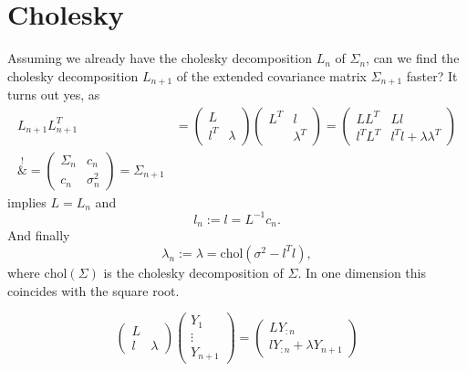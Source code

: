 \section{Cholesky}

Assuming we already have the cholesky decomposition \(L_n\) of \(\Sigma_n\),
can we find the cholesky decomposition \(L_{n+1}\) of the extended covariance
matrix \(\Sigma_{n+1}\) faster? It turns out yes, as
\[
	\begin{aligned}
	L_{n+1}L_{n+1}^T
	&=\begin{pmatrix}
		L & \\
		l^T &\lambda
	\end{pmatrix}
	\begin{pmatrix}
		L^T &  l\\
		&\lambda^T
	\end{pmatrix}
	= \begin{pmatrix}
		L L^T & L l\\
		l^T L^T & l^T l + \lambda\lambda^T
	\end{pmatrix}\\
	\overset!&= \begin{pmatrix}
		\Sigma_n & c_n \\
		c_n & \sigma_n^2
	\end{pmatrix} = \Sigma_{n+1}
	\end{aligned}
\]
implies \(L = L_n\) and
\[
	l_n := l = L^{-1}c_n.
\]
And finally
\[
	\lambda_n := \lambda = \text{chol}(\sigma^2 - l^T l),
\]
where \(\text{chol}(\Sigma)\) is the cholesky decomposition of \(\Sigma\). In
one dimension this coincides with the square root.


\[
	\begin{pmatrix}
		L & \\
		l & \lambda
	\end{pmatrix}
	\begin{pmatrix}
		Y_1\\
		\vdots\\
		Y_{n+1}
	\end{pmatrix}
	= \begin{pmatrix}
		L Y_{:n} \\
	 	l Y_{:n} + \lambda Y_{n+1}
	\end{pmatrix}
\]